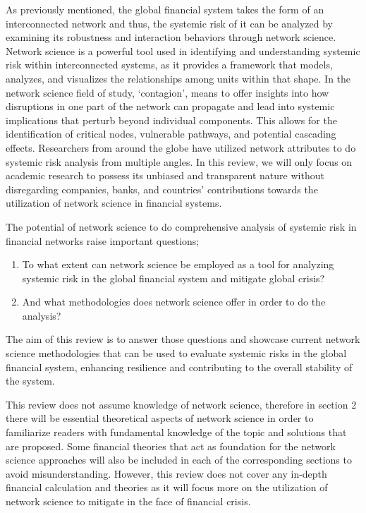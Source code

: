 \documentclass[a4paper,11pt]{article}
\begin{document}
As previously mentioned, the global financial system takes the form of an interconnected network and thus, the systemic risk of it can be analyzed by examining its robustness and interaction behaviors through network science. Network science is a powerful tool used in identifying and understanding systemic risk within interconnected systems, as it provides a framework that models, analyzes, and visualizes the relationships among units within that shape. In the network science field of study, ‘contagion’, means to offer insights into how disruptions in one part of the network can propagate and lead into systemic implications that perturb beyond individual components. This allows for the identification of critical nodes, vulnerable pathways, and potential cascading effects. Researchers from around the globe have utilized network attributes to do systemic risk analysis from multiple angles. In this review, we will only focus on academic research  to possess  its unbiased and transparent nature without disregarding companies, banks, and countries’ contributions towards the utilization of network science in financial systems.

The potential of network science to do comprehensive analysis of systemic risk in financial networks raise important questions;
\begin{enumerate}
    \item To what extent can network science be employed as a tool for analyzing systemic risk in the global financial system and mitigate global crisis? 
    \item And what methodologies does network science offer in order to do the analysis? 
\end{enumerate}
The aim of this review is to answer those questions and showcase current network science methodologies that can be used to evaluate systemic risks in the global financial system, enhancing resilience and contributing to the overall stability of the system.

This review does not assume knowledge of network science, therefore in section 2 there will be essential theoretical aspects of network science in order to familiarize readers with fundamental knowledge of the topic and solutions that are proposed. Some financial theories that act as foundation for the network science approaches will also be included in each of the corresponding sections to avoid misunderstanding. However, this review does not cover any in-depth financial calculation and theories as it will focus more on the utilization of network science to mitigate in the face of financial crisis.
\end{document}
